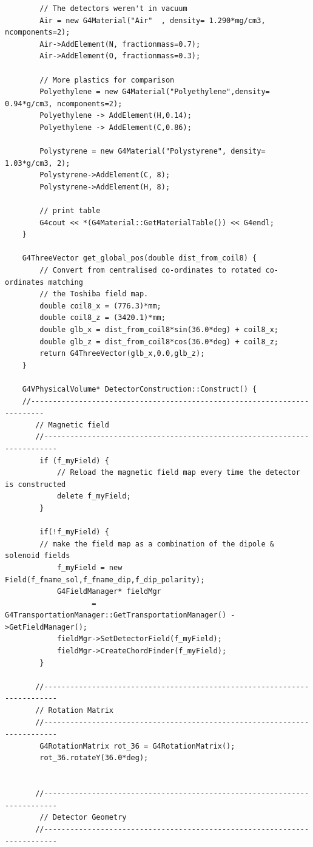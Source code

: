 \documentclass[]{article}
\begin{document}
\begin{verbatim}
        // The detectors weren't in vacuum
        Air = new G4Material("Air"  , density= 1.290*mg/cm3, ncomponents=2);
        Air->AddElement(N, fractionmass=0.7);
        Air->AddElement(O, fractionmass=0.3);
    
        // More plastics for comparison
        Polyethylene = new G4Material("Polyethylene",density= 0.94*g/cm3, ncomponents=2);
        Polyethylene -> AddElement(H,0.14);
        Polyethylene -> AddElement(C,0.86);
    
        Polystyrene = new G4Material("Polystyrene", density= 1.03*g/cm3, 2);
        Polystyrene->AddElement(C, 8);
        Polystyrene->AddElement(H, 8);
        
        // print table
        G4cout << *(G4Material::GetMaterialTable()) << G4endl;
    }
    
    G4ThreeVector get_global_pos(double dist_from_coil8) {
        // Convert from centralised co-ordinates to rotated co-ordinates matching 
        // the Toshiba field map.
        double coil8_x = (776.3)*mm;
        double coil8_z = (3420.1)*mm;
        double glb_x = dist_from_coil8*sin(36.0*deg) + coil8_x;
        double glb_z = dist_from_coil8*cos(36.0*deg) + coil8_z;
        return G4ThreeVector(glb_x,0.0,glb_z);
    }
    
    G4VPhysicalVolume* DetectorConstruction::Construct() {
    //-------------------------------------------------------------------------
       // Magnetic field
       //-------------------------------------------------------------------------
        if (f_myField) {
            // Reload the magnetic field map every time the detector is constructed
            delete f_myField;
        }
    
        if(!f_myField) {
        // make the field map as a combination of the dipole & solenoid fields
            f_myField = new Field(f_fname_sol,f_fname_dip,f_dip_polarity);
            G4FieldManager* fieldMgr
                    = G4TransportationManager::GetTransportationManager() ->GetFieldManager();
            fieldMgr->SetDetectorField(f_myField);
            fieldMgr->CreateChordFinder(f_myField);
        }
    
       //-------------------------------------------------------------------------
       // Rotation Matrix
       //-------------------------------------------------------------------------
        G4RotationMatrix rot_36 = G4RotationMatrix();
        rot_36.rotateY(36.0*deg);
    
    
       //-------------------------------------------------------------------------
        // Detector Geometry
       //-------------------------------------------------------------------------
       

\end{verbatim}
\end{document}
